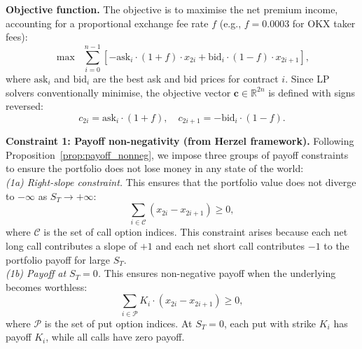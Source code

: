 \documentclass[openany]{book}
\numberwithin{figure}{chapter}
\numberwithin{equation}{chapter}
\begin{document}
\textbf{Objective function.} The objective is to maximise the net premium income, accounting for a proportional exchange fee rate $f$ (e.g., $f = 0.0003$ for OKX taker fees):
\begin{equation}
\max \;\; \sum_{i=0}^{n-1} \left[ -\text{ask}_i \cdot (1 + f) \cdot x_{2i} + \text{bid}_i \cdot (1 - f) \cdot x_{2i+1} \right],
\label{eq:objective}
\end{equation}
where $\text{ask}_i$ and $\text{bid}_i$ are the best ask and bid prices for contract $i$. Since LP solvers conventionally minimise, the objective vector $\mathbf{c} \in \mathbb{R}^{2n}$ is defined with signs reversed:
$$c_{2i} = \text{ask}_i \cdot (1 + f), \quad c_{2i+1} = -\text{bid}_i \cdot (1 - f).$$


\textbf{Constraint 1: Payoff non-negativity (from Herzel framework).} Following Proposition~\ref{prop:payoff_nonneg}, we impose three groups of payoff constraints to ensure the portfolio does not lose money in any state of the world:\\

\textit{(1a) Right-slope constraint.} This ensures that the portfolio value does not diverge to $-\infty$ as $S_T \to +\infty$:
\begin{equation}
\sum_{i \in \mathcal{C}} (x_{2i} - x_{2i+1}) \geq 0,
\label{eq:right_slope}
\end{equation}
where $\mathcal{C}$ is the set of call option indices. This constraint arises because each net long call contributes a slope of $+1$ and each net short call contributes $-1$ to the portfolio payoff for large $S_T$.\\

\textit{(1b) Payoff at $S_T = 0$.} This ensures non-negative payoff when the underlying becomes worthless:
\begin{equation}
\sum_{i \in \mathcal{P}} K_i \cdot (x_{2i} - x_{2i+1}) \geq 0,
\label{eq:payoff_zero}
\end{equation}
where $\mathcal{P}$ is the set of put option indices. At $S_T = 0$, each put with strike $K_i$ has payoff $K_i$, while all calls have zero payoff.\\
\end{document}
